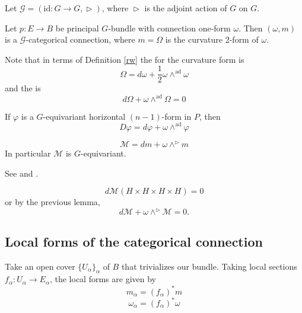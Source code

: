 \begin{example}
Let $\mathcal{G}=(\text{id}:G\rightarrow G,\vartriangleright)$, where $\vartriangleright$ is the adjoint action of $G$ on $G$.

Let $p:E\rightarrow B$ be principal $G$-bundle with connection one-form $\omega$. Then $(\omega,m)$ is a $\mathcal{G}$-categorical connection, where $m=\Omega$ is the curvature 2-form of $\omega$.

Note that in terms of Definition \ref{rw} the  for the curvature form is
\[
 \Omega=d\omega +\frac{1}{2}\omega\wedge^{\text{ad}}\omega
\]
and the  is \[
                                          d\Omega+\omega\wedge^{\text{ad}}\Omega=0
                                         \]

\end{example}


\begin{lemma}
 If $\varphi$ is a $G$-equivariant horizontal $(n-1)$-form in $P$, then
\[
 D\varphi =d\varphi +\omega \wedge^{\text{ad}}\varphi
\]

\end{lemma}


\begin{prop}
 \[\mathcal{M}=dm+\omega\wedge^{\vartriangleright}m \]
In particular $\mathcal{M}$ is $G$-equivariant.
\end{prop}

See \cite[p. 79]{kobayashi1} and \cite[p. 19]{picken_faria}.

% 
% 

\begin{prop}
 \[
  d\mathcal{M}(H\times H\times H\times H)=0
 \]
or by the previous lemma,
\[
 d\mathcal{M}+\omega\wedge^\vartriangleright \mathcal{M}=0.
\]
\end{prop}

\subsection{Local forms of the categorical connection}
Take an open cover $\{U_\alpha\}_\alpha$ of $B$ that trivializes our bundle. Taking local sections $f_\alpha:U_\alpha\rightarrow E_\alpha$, the local forms are given by \[
              m_\alpha=(f_\alpha)^*m
		   \]
\[
 \omega_\alpha=(f_\alpha)^*\omega
\]

